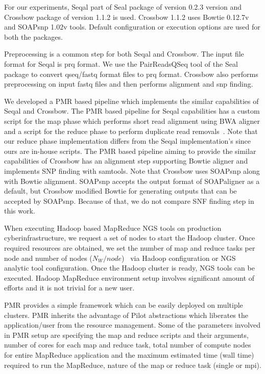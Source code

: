 \documentclass{acm_proc_article-sp}
\begin{document}
For our experiments, Seqal part of Seal package
of version 0.2.3 version and Crossbow package of version 1.1.2 is
used. Crossbow 1.1.2 uses Bowtie 0.12.7v and SOAPsnp 1.02v
tools. Default configuration or execution options are used for both
the packages.

Preprocessing is a common step for both Seqal and Crossbow. The input
file format for Seqal is prq format.  We use the PairReadsQSeq tool of
the Seal package to convert qseq/fastq format files to prq
format. Crossbow also performs preprocessing on input fastq files and
then performs alignment and snp finding. 

We developed a PMR based pipeline which implements the similar capabilities of Seqal
and Crossbow.  The PMR based pipeline for Seqal capabilities has a
custom script for the map phase which performs short read alignment using BWA
aligner and a script for the reduce phase to perform duplicate read removals~\cite{seal_2011_mapred}.  Note that our reduce
phase implementation differs from the Seqal implementation's since ours are in-house scripts.  The PMR based pipeline aiming to provide the similar capabilities of Crossbow has an alignment step supporting Bowtie aligner and implements SNP finding with samtools.  Note that Crossbow uses SOAPsnp along with Bowtie alignment.   SOAPsnp accepts the output format of SOAPaligner as a default, but Crossbow modified Bowtie for generating outputs that can be accepted by SOAPsnp.  Because of that, we do not compare SNF finding step in this work.


When executing Hadoop based MapReduce NGS tools on production
cyberinfrastructure, we request a set of nodes to start the Hadoop
cluster. Once required resources are obtained, we set the number of
map and reduce tasks per node and number of nodes
($N_{W}/node$)~ via Hadoop
configuration or NGS analytic tool configuration.  Once the Hadoop
cluster is ready, NGS tools can be executed. Hadoop MapReduce
environment setup involves significant amount of efforts and it is not
trivial for a new user.

PMR provides a simple framework which can be easily deployed on
multiple clusters. PMR inherits the advantage of Pilot abstractions
which liberates the application/user from the resource
management. Some of the parameters involved in PMR setup are
specifying the map and reduce scripts and their arguments, number of
cores for each map and reduce task, total number of compute nodes for
entire MapReduce application and the maximum estimated time (wall
time) required to run the MapReduce, nature of the map or reduce task
(single or mpi).
\end{document}

